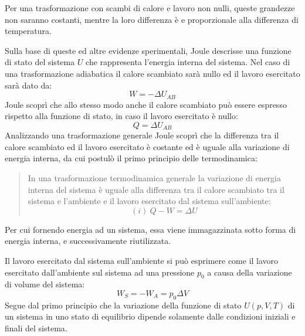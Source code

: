 \documentclass{article}
\numberwithin{equation}{subsection}
\begin{document}
Per una trasformazione con scambi di calore e lavoro non nulli, queste grandezze non saranno costanti, mentre la loro differenza è e proporzionale alla differenza 
di temperatura.  



Sulla base di queste ed altre evidenze sperimentali, Joule 
descrisse una funzione di stato del sistema $U$ che 
rappresenta l'energia interna del sistema. Nel caso di una 
trasformazione adiabatica il calore scambiato sarà nullo ed il 
lavoro esercitato sarà dato da:
\begin{equation}
    W=-\Delta U_{AB}
\end{equation}
Joule scoprì che allo stesso modo anche il calore scambiato 
può essere espresso 
rispetto alla funzione di stato, in caso il lavoro esercitato 
è nullo:
\begin{equation}
    Q=\Delta U_{AB}
\end{equation}
Analizzando una trasformazione generale Joule scoprì che 
la differenza tra il calore scambiato ed il lavoro esercitato è 
costante ed è uguale alla variazione di energia interna, da cui 
postulò il primo principio delle termodinamica:
\begin{quotation}
    In una trasformazione termodinamica generale la variazione 
    di energia interna del sistema è uguale alla differenza tra 
    il calore scambiato tra il sistema e l'ambiente e il lavoro 
    esercitato dal sistema sull'ambiente:
    \begin{equation*}
     (i)\:   Q-W=\Delta U
    \end{equation*}
\end{quotation}
Per cui fornendo energia ad un sistema, essa viene immagazzinata sotto forma di energia interna, e successivamente riutilizzata. 



Il lavoro esercitato dal sistema sull'ambiente si può 
esprimere come il lavoro esercitato dall'ambiente sul sistema 
ad una pressione $p_0$ a causa della variazione di volume 
del sistema:
\begin{equation*}
    W_S=-W_A=p_0\Delta V
\end{equation*}
Segue dal primo principio che la 
variazione della funzione di stato $U(p,V,T)$ di un sistema in uno stato 
di equilibrio dipende solamente dalle condizioni iniziali e 
finali del sistema. 
\end{document}
